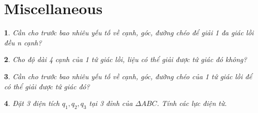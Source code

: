\documentclass{article}
\newtheorem{baitoan}{}
\begin{document}

\section{Miscellaneous}

\begin{baitoan}
	Cần cho trước bao nhiêu yếu tố về cạnh, góc, đường chéo để giải 1 đa giác lồi đều n cạnh?
\end{baitoan}

\begin{baitoan}
	Cho độ dài 4 cạnh của 1 tứ giác lồi, liệu có thể giải được tứ giác đó không?
\end{baitoan}

\begin{baitoan}
	Cần cho trước bao nhiêu yếu tố về cạnh, góc, đường chéo của 1 tứ giác lồi để có thể giải được tứ giác đó?
\end{baitoan}

\begin{baitoan}
	Đặt 3 điện tích $q_1,q_2,q_3$ tại 3 đỉnh của $\Delta ABC$. Tính các lực điện từ.
\end{baitoan}


\printbibliography[heading=bibintoc]
	
\end{document}
